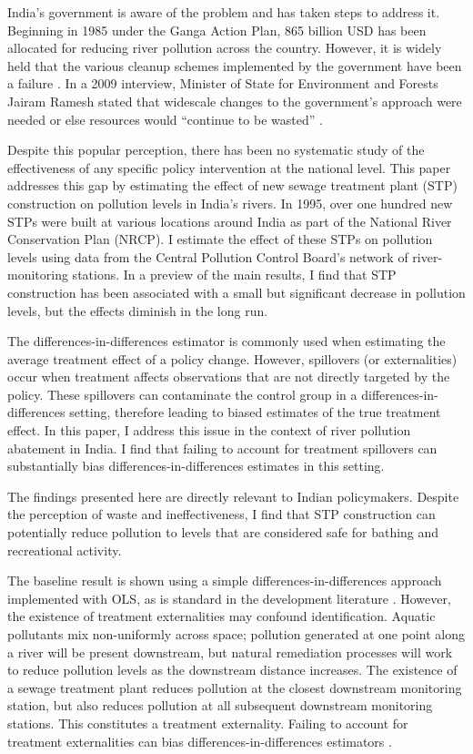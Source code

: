 \documentclass[12pt]{article}
\newcommand{\did}{differences-in-differences }
\begin{document}
India's government is aware of the problem and has taken steps to address it. Beginning in 1985 under the Ganga Action Plan, 865 billion USD has been allocated for reducing river pollution across the country. However, it is widely held that the various cleanup schemes implemented by the government have been a failure \citep{hindu}. In a 2009 interview, Minister of State for Environment and Forests Jairam Ramesh stated that widescale changes to the government's approach were needed or else resources would ``continue to be wasted'' \citep{indiatoday}.

Despite this popular perception, there has been no systematic study of the effectiveness of any specific policy intervention at the national level. This paper addresses this gap by estimating the effect of new sewage treatment plant (STP) construction on pollution levels in India's rivers. In 1995, over one hundred new STPs were built at various locations around India as part of the National River Conservation Plan (NRCP). I estimate the effect of these STPs on pollution levels using data from the Central Pollution Control Board's network of river-monitoring stations. In a preview of the main results, I find that STP construction has been associated with a small but significant decrease in pollution levels, but the effects diminish in the long run.

The differences-in-differences estimator is commonly used when estimating the average treatment effect of a policy change. However, spillovers (or externalities) occur when treatment affects observations that are not directly targeted by the policy. These spillovers can contaminate the control group in a \did setting, therefore leading to biased estimates of the true treatment effect. In this paper, I address this issue in the context of river pollution abatement in India. I find that failing to account for treatment spillovers can substantially bias \did estimates in this setting. 

The findings presented here are directly relevant to Indian policymakers. Despite the perception of waste and ineffectiveness, I find that STP construction can potentially reduce pollution to levels that are considered safe for bathing and recreational activity. 

The baseline result is shown using a simple \did approach implemented with OLS, as is standard in the development literature \citep{greenstone2015}. However, the existence of treatment externalities may confound identification. Aquatic pollutants mix non-uniformly across space; pollution generated at one point along a river will be present downstream, but natural remediation processes will work to reduce pollution levels as the downstream distance increases. The existence of a sewage treatment plant reduces pollution at the closest downstream monitoring station, but also reduces pollution at all subsequent downstream monitoring stations. This constitutes a treatment externality. Failing to account for treatment externalities can bias \did estimators \citep{miguel2004}. 
\end{document}

